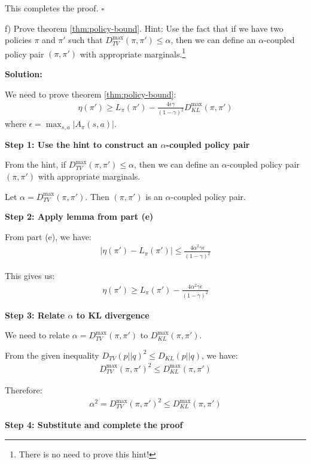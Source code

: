 This completes the proof. $\square$

f) Prove theorem \ref{thm:policy-bound}. Hint: Use the fact that if we have two policies $\pi$ and $\pi'$ such that $D_{TV}^{\max} (\pi, \pi') \le \alpha$, then we can define an $\alpha$-coupled policy pair $(\pi, \pi')$ with appropriate marginals.\footnote{There is no need to prove this hint!}

\textbf{Solution:}

We need to prove theorem \ref{thm:policy-bound}:
\begin{align*}
\eta(\pi') \ge L_{\pi}(\pi') - \frac{4\epsilon\gamma}{(1-\gamma)^2}D_{KL}^{\max}(\pi, \pi')
\end{align*}
where $\epsilon = \max_{s, a} |A_{\pi}(s, a)|$.

\textbf{Step 1: Use the hint to construct an $\alpha$-coupled policy pair}

From the hint, if $D_{TV}^{\max} (\pi, \pi') \le \alpha$, then we can define an $\alpha$-coupled policy pair $(\pi, \pi')$ with appropriate marginals.

Let $\alpha = D_{TV}^{\max} (\pi, \pi')$. Then $(\pi, \pi')$ is an $\alpha$-coupled policy pair.

\textbf{Step 2: Apply lemma from part (e)}

From part (e), we have:
\begin{align}
|\eta(\pi') - L_{\pi}(\pi')| \le \frac{4\alpha^2\gamma\epsilon}{(1-\gamma)^2}
\end{align}

This gives us:
\begin{align}
\eta(\pi') \ge L_{\pi}(\pi') - \frac{4\alpha^2\gamma\epsilon}{(1-\gamma)^2}
\end{align}

\textbf{Step 3: Relate $\alpha$ to KL divergence}

We need to relate $\alpha = D_{TV}^{\max} (\pi, \pi')$ to $D_{KL}^{\max}(\pi, \pi')$.

From the given inequality $D_{TV}(p||q)^2 \le D_{KL}(p||q)$, we have:
\begin{align}
D_{TV}^{\max} (\pi, \pi')^2 \le D_{KL}^{\max}(\pi, \pi')
\end{align}

Therefore:
\begin{align}
\alpha^2 = D_{TV}^{\max} (\pi, \pi')^2 \le D_{KL}^{\max}(\pi, \pi')
\end{align}

\textbf{Step 4: Substitute and complete the proof}

